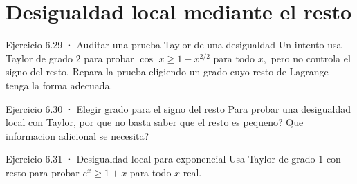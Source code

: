 \documentclass[10pt,a4paper,oneside,openany]{book}
\begin{document}
\section{Desigualdad local mediante el resto}
\begin{PSevenExerciseFixed}{Ejercicio 6.29 · Auditar una prueba Taylor de una desigualdad}
Un intento usa Taylor de grado \(2\) para probar \(\cos\) \(x\ge 1-x^{2/2}\) para todo \(x,\) pero no controla el signo del resto. Repara la prueba eligiendo un grado cuyo resto de Lagrange tenga la forma adecuada.
\end{PSevenExerciseFixed}
\begin{PSevenExerciseFixed}{Ejercicio 6.30 · Elegir grado para el signo del resto}
Para probar una desigualdad local con Taylor, por que no basta saber que el resto es pequeno? Que informacion adicional se necesita?
\end{PSevenExerciseFixed}
\begin{PSevenExerciseFixed}{Ejercicio 6.31 · Desigualdad local para exponencial}
Usa Taylor de grado \(1\) con resto para probar \(e^x\ge 1+x\) para todo \(x\) real.
\end{PSevenExerciseFixed}
\end{document}
